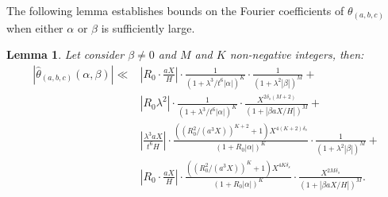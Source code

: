 \documentclass{article}
\newtheorem{lemma}[theorem]{Lemma}
\begin{document}
The following lemma establishes bounds on the Fourier coefficients of $\theta_{(a,b,c)}$ when either $\alpha$ or $\beta$ is sufficiently large.

\begin{lemma}\label{theta-fourier-coeff}
    Let consider $\beta\neq 0$ and $M$ and $K$ non-negative integers, then:
    \begin{align*}
        |\widehat \theta_{(a,b,c)}(\alpha,\beta)| \ll 
        &|R_0\cdot\frac{aX}{H}| \cdot \frac{1}{(1+\lambda^{3}/t^6|\alpha|)^K} \cdot \frac{1}{(1+\lambda^2|\beta|)^M}+\\
        &  |R_0\lambda^2| \cdot\frac{1}{(1+\lambda^{3}/t^6|\alpha|)^K}\cdot \frac{X^{2\delta_s(M+2)}}{(1+ |\beta aX/H|)^M}+\\
         &  |\frac{\lambda^{3}aX}{t^6H}| \cdot\frac{((R_0^2/(a^3X))^{K+2}+1) X^{4(K+2)\delta_s}}{(1+R_0|\alpha|)^K} \cdot\frac{1}{(1+ \lambda^2|\beta|)^M}+\\
          &|R_0\cdot\frac{aX}{H}| \cdot\frac{((R_0^2/(a^3X))^{K}+1) X^{4K\delta_s}}{(1+R_0|\alpha|)^K} \cdot\frac{X^{2M\delta_s}}{(1+ |\beta aX/H|)^M}.   
\end{align*} 
\end{lemma}
\end{document}
